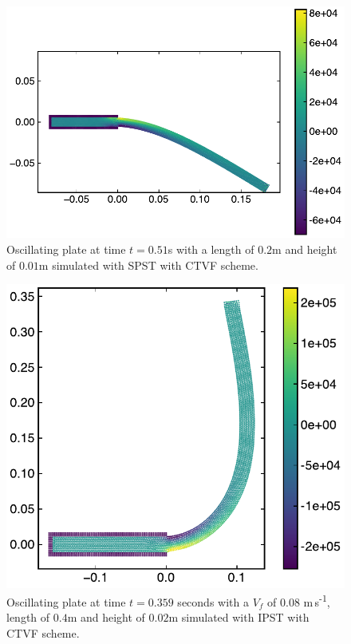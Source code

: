 \documentclass[preprint,12pt]{elsarticle}
\begin{document}
\begin{figure}[!htpb]
  \centering
  \includegraphics[width=1\linewidth]{fig_20}
  \caption{Oscillating plate at time $t=0.51$s with a length of $0.2$m and
    height of $0.01$m simulated with SPST with CTVF scheme.}
\label{fig:oscillating-plate:etvf-sun2019-l-0-2-h-0-01}
\end{figure}
%
%
\begin{figure}[!htpb]
  \centering
  \includegraphics[width=1\linewidth]{fig_21}
  \caption{Oscillating plate at time $t=0.359$ seconds with a $V_f$ of $0.08$
    m\,s\textsuperscript{-1}, length of $0.4$m and height of $0.02$m simulated
    with IPST with CTVF scheme.}
\label{fig:oscillating-plate:etvf-ipst-l-0-4-h-0-02}
\end{figure}
\end{document}

